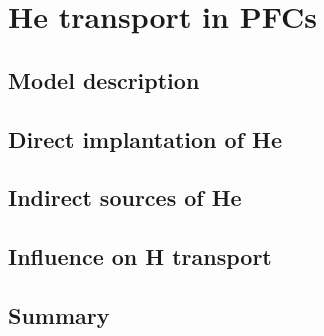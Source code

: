 \setchapterpreamble[u]{\margintoc}
\chapter{He transport in PFCs}
\label{Chapter5} %


\section{Model description}\label{helium model description}

\section{Direct implantation of He}

\section{Indirect sources of He}

\section{Influence on H transport}


\section{Summary}